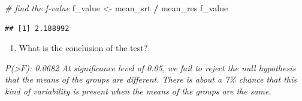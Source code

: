 \documentclass[]{article}
\newenvironment{Shaded}{\begin{snugshade}}{\end{snugshade}}
\newcommand{\CommentTok}[1]{\textcolor[rgb]{0.56,0.35,0.01}{\textit{#1}}}
\newcommand{\NormalTok}[1]{#1}
\newcommand{\OperatorTok}[1]{\textcolor[rgb]{0.81,0.36,0.00}{\textbf{#1}}}
\newcommand{\StringTok}[1]{\textcolor[rgb]{0.31,0.60,0.02}{#1}}
\providecommand{\tightlist}{%
  \setlength{\itemsep}{0pt}\setlength{\parskip}{0pt}}
\begin{document}
\begin{Shaded}
\begin{Highlighting}[]
\CommentTok{# find the f-value}
\NormalTok{f_value <-}\StringTok{ }\NormalTok{mean_srt }\OperatorTok{/}\StringTok{ }\NormalTok{mean_res}
\NormalTok{f_value}
\end{Highlighting}
\end{Shaded}

\begin{verbatim}
## [1] 2.188992
\end{verbatim}

\begin{enumerate}
\def\labelenumi{(\alph{enumi})}
\setcounter{enumi}{3}
\tightlist
\item
  What is the conclusion of the test?
\end{enumerate}

\emph{P(\textgreater{}\(F\)): 0.0682 At significance level of 0.05, we
fail to reject the null hypothesis that the means of the groups are
different. There is about a 7\% chance that this kind of variability is
present when the means of the groups are the same.}
\end{document}
